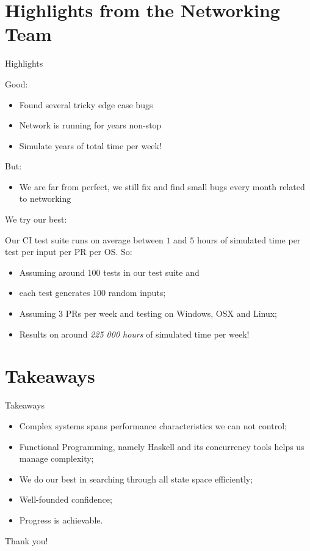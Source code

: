 \documentclass{beamer}
\begin{document}
\section{Highlights from the Networking Team}

\begin{frame}{Highlights}

  Good:
  \begin{itemize}
    \item Found several tricky edge case bugs
    \item Network is running for years non-stop
    \item Simulate years of total time per week!
  \end{itemize}

  But:
  \begin{itemize}
    \item We are far from perfect, we still fix and find small bugs every month related to networking
  \end{itemize}

  We try our best:

  Our CI test suite runs on average between $1$ and $5$ hours of simulated time per test
  per input per PR per OS. So:

  \begin{itemize}
    \item Assuming around 100 tests in our test suite and
    \item each test generates 100 random inputs;
    \item Assuming 3 PRs per week and testing on Windows, OSX and Linux;
    \item Results on around \emph{225 000 hours} of simulated time per week!
  \end{itemize}
\end{frame}

\section{Takeaways}

\begin{frame}{Takeaways}
  \begin{itemize}
    \item Complex systems spans performance characteristics we can not control;
    \item Functional Programming, namely Haskell and its concurrency tools helps us manage complexity;
    \item We do our best in searching through all state space efficiently;
    \item Well-founded confidence;
    \item Progress is achievable.
  \end{itemize}
\end{frame}

\begin{frame}
  \centering
  Thank you!
\end{frame}
\end{document}
